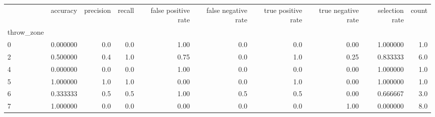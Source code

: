 \begin{tabular}{lrrrrrrrrr}
\toprule
{} &  accuracy &  precision &  recall &  false positive rate &  false negative rate &  true positive rate &  true negative rate &  selection rate &  count \\
throw\_zone &           &            &         &                      &                      &                     &                     &                 &        \\
\midrule
0          &  0.000000 &        0.0 &     0.0 &                 1.00 &                  0.0 &                 0.0 &                0.00 &        1.000000 &    1.0 \\
2          &  0.500000 &        0.4 &     1.0 &                 0.75 &                  0.0 &                 1.0 &                0.25 &        0.833333 &    6.0 \\
4          &  0.000000 &        0.0 &     0.0 &                 1.00 &                  0.0 &                 0.0 &                0.00 &        1.000000 &    1.0 \\
5          &  1.000000 &        1.0 &     1.0 &                 0.00 &                  0.0 &                 1.0 &                0.00 &        1.000000 &    1.0 \\
6          &  0.333333 &        0.5 &     0.5 &                 1.00 &                  0.5 &                 0.5 &                0.00 &        0.666667 &    3.0 \\
7          &  1.000000 &        0.0 &     0.0 &                 0.00 &                  0.0 &                 0.0 &                1.00 &        0.000000 &    8.0 \\
\bottomrule
\end{tabular}
